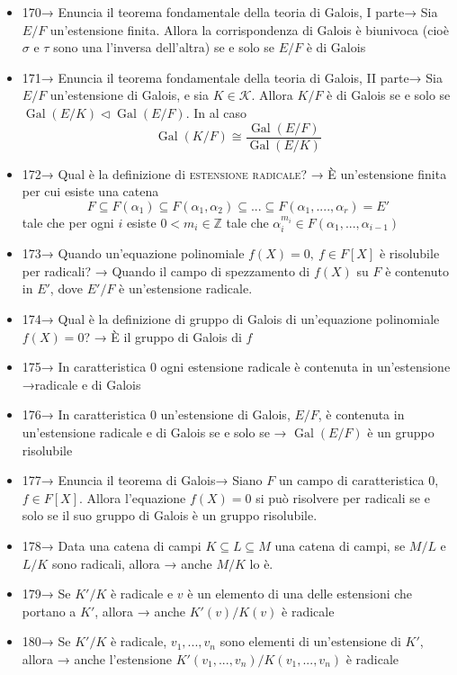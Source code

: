 \documentclass[A4,12pt]{article}
\newcommand{\Z}{\mathbb{Z}}
\renewcommand{\subset}{\subseteq}
\begin{document}
\begin{itemize}[noitemsep]
		\item 170→ Enuncia il teorema fondamentale della teoria di Galois, I parte→ Sia $ E/F $ un'estensione finita. Allora la corrispondenza di Galois è biunivoca (cioè $ \sigma $ e $ \tau $ sono una l'inversa dell'altra) se e solo se $ E/F $ è di Galois
		\item 171→ Enuncia il teorema fondamentale della teoria di Galois, II parte→ Sia $ E/F $ un'estensione di Galois, e sia $ K\in \mathscr{K} $. Allora $ K/F $ è di Galois se e solo se $ \operatorname{Gal}(E/K)\lhd \operatorname{Gal}(E/F) $. In al caso \[\operatorname{Gal}(K/F)\cong \frac{\operatorname{Gal}(E/F)}{\operatorname{Gal}(E/K)}\]
		\item 172→ Qual è la definizione di \textsc{estensione radicale}? → È un'estensione finita per cui esiste una catena \[F\subset F(\alpha_1)\subset F(\alpha_1,\alpha_2)\subset...\subset F(\alpha_1,....,\alpha_r)=E'\]
		tale che per ogni $ i $ esiste $ 0<m_i\in \Z $ tale che $ \alpha_i^{m_i}\in F(\alpha_1,...,\alpha_{i-1}) $
		\item 173→ Quando un'equazione polinomiale $ f(X)=0,\ f\in F[X] $ è risolubile per radicali? → Quando il campo di spezzamento di $ f(X) $ su $ F $ è contenuto in $ E' $, dove $ E'/F $ è un'estensione radicale.
		\item 174→ Qual è la definizione di gruppo di Galois di un'equazione polinomiale $ f(X) = 0 $? →	È il gruppo di Galois di $ f $
		\item 175→ In caratteristica 0 ogni  estensione radicale è contenuta in un'estensione →radicale e di Galois
		\item 176→ In caratteristica 0 un'estensione di Galois, $ E/F $, è contenuta in un'estensione radicale e di Galois se e solo se → $ \operatorname{Gal}(E/F) $ è un gruppo risolubile
		\item 177→ Enuncia il teorema di Galois→ Siano $ F $ un campo di caratteristica 0, $ f\in F[X] $. Allora l'equazione $ f(X)=0 $ si può risolvere per radicali se e solo se il suo gruppo di Galois è un gruppo risolubile.
		\item 178→ Data una catena di campi $ K\subset L\subset M $ una catena di campi, se $ M/L $ e $ L/K $ sono radicali, allora → anche $ M/K $ lo è.
		\item 179→ Se $ K'/K $ è radicale e $ v $ è un elemento di una delle estensioni che portano a $ K' $, allora → anche $ K'(v)/K(v) $ è radicale
		\item 180→ Se $ K'/K $ è radicale, $ v_1,...,v_n $ sono elementi di un'estensione di $ K' $, allora → anche l'estensione $ K'(v_1,...,v_n)/K(v_1,...,v_n) $ è radicale

\end{itemize}
\end{document}
